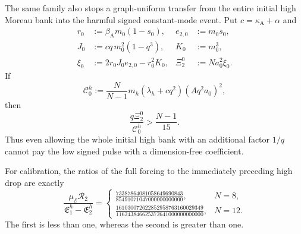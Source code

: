 \begin{proposition}
The same family also stops a graph-uniform transfer from the entire initial
high Moreau bank into the harmful signed constant-mode event.  Put
$c=\kappa_{\mathrm A}+\alpha$ and
\begin{align*}
 r_0&:=\beta_{\mathrm A}m_0(1-s_0),
 &e_{2,0}&:=m_0s_0,\\
 J_0&:=c q\,m_0^2(1-q^3),
 &K_0&:=m_0^3,\\
 \xi_0&:=2r_0J_0e_{2,0}-r_0^2K_0,
 &\Xi_2^0&:=Na_0^2\xi_0.
\end{align*}
If
\begin{equation*}
 \mathcal C_0^h
 :=\frac N{N-1}m_h(\lambda_h+cq^2)(Aq^2a_0)^2,
\end{equation*}
then
\begin{equation}
 \frac{q\Xi_2^0}{\mathcal C_0^h}
 >\frac{N-1}{15}.
 \label{eq:aesp-cd-kn-high-to-low-stop}
\end{equation}
Thus even allowing the whole initial high bank with an additional factor
$1/q$ cannot pay the low signed pulse with a dimension-free coefficient.

For calibration, the ratios of the full forcing to the immediately preceding
high drop are exactly
\begin{equation}
 \frac{\mu_{\mathcal E}\mathcal R_2}
      {\mathfrak E_1^h-\mathfrak E_2^h}
 =\begin{cases}
 \displaystyle
 \frac{73387864081058649690843}{85491071047000000000000},&N=8,\\[2mm]
 \displaystyle
 \frac{161030072622852958763160029349}
      {116243846625372641000000000000},&N=12.
 \end{cases}
 \label{eq:aesp-cd-kn-preceding-high-ratios}
\end{equation}
The first is less than one, whereas the second is greater than one.
\end{proposition}

